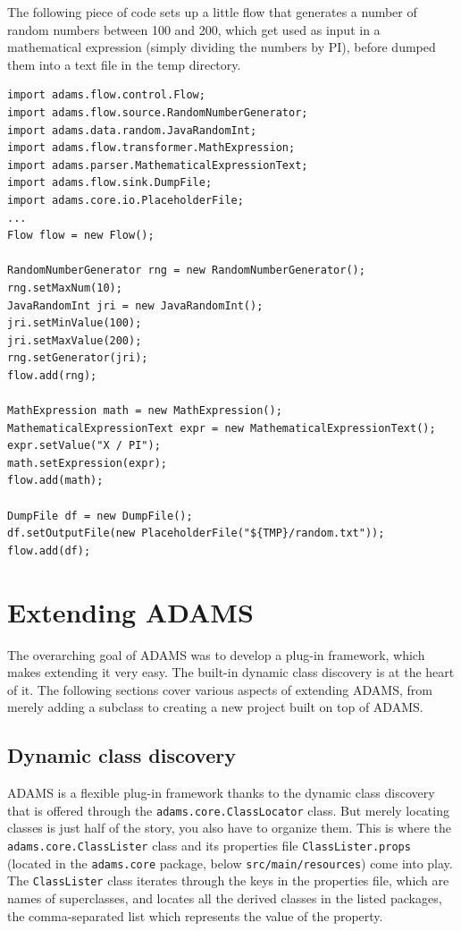 The following piece of code sets up a little flow that generates a number
of random numbers between 100 and 200, which get used as input in a mathematical 
expression (simply dividing the numbers by PI), before dumped them into a 
text file in the temp directory.
\begin{verbatim}
import adams.flow.control.Flow;
import adams.flow.source.RandomNumberGenerator;
import adams.data.random.JavaRandomInt;
import adams.flow.transformer.MathExpression;
import adams.parser.MathematicalExpressionText;
import adams.flow.sink.DumpFile;
import adams.core.io.PlaceholderFile;
...
Flow flow = new Flow();

RandomNumberGenerator rng = new RandomNumberGenerator();
rng.setMaxNum(10);
JavaRandomInt jri = new JavaRandomInt();
jri.setMinValue(100);
jri.setMaxValue(200);
rng.setGenerator(jri);
flow.add(rng);

MathExpression math = new MathExpression();
MathematicalExpressionText expr = new MathematicalExpressionText();
expr.setValue("X / PI");
math.setExpression(expr);
flow.add(math);

DumpFile df = new DumpFile();
df.setOutputFile(new PlaceholderFile("${TMP}/random.txt"));
flow.add(df);
\end{verbatim}

\chapter{Extending ADAMS}
The overarching goal of ADAMS was to develop a plug-in framework, which makes
extending it very easy. The built-in dynamic class discovery is at the heart of
it. The following sections cover various aspects of extending ADAMS, from merely
adding a subclass to creating a new project built on top of ADAMS.

\section{Dynamic class discovery}
\label{dynamic_class_discovery}
ADAMS is a flexible plug-in framework thanks to the dynamic class discovery that
is offered through the \texttt{adams.core.ClassLocator} class. But merely
locating classes is just half of the story, you also have to organize them. This
is where the \texttt{adams.core.ClassLister} class and its properties file
\texttt{ClassLister.props} (located in the \texttt{adams.core} package, below
\texttt{src/main/resources}) come into play. The \texttt{ClassLister} class
iterates through the keys in the properties file, which are names of
superclasses, and locates all the derived classes in the listed packages, the
comma-separated list which represents the value of the property.

